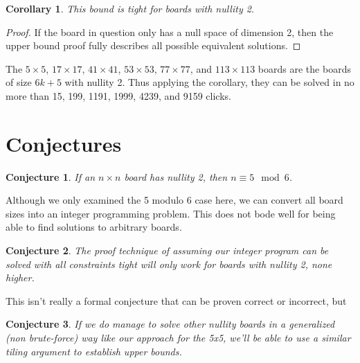 \documentclass{article}
\newtheorem{corollary}{Corollary}
\newtheorem{conjecture}{Conjecture}
\begin{document}
	\begin{corollary}
		This bound is tight for boards with nullity 2.
	\end{corollary}
	\begin{proof}
		If the board in question only has a null space of dimension 2, then the upper bound proof fully describes all possible equivalent solutions.
	\end{proof}

	The $5 \times 5$, $17 \times 17$, $41 \times 41$, $53 \times 53$, $77 \times 77$, and $113 \times 113$ boards are the boards of size $6k+5$ with nullity 2.
	Thus applying the corollary, they can be solved in no more than 15, 199, 1191, 1999, 4239, and 9159 clicks.
	
	\section{Conjectures}
	\begin{conjecture}
		If an $n \times n$ board has nullity 2, then $n \equiv 5 \mod 6$.
	\end{conjecture}

	Although we only examined the 5 modulo 6 case here, we can convert all board sizes into an integer programming problem.
	This does not bode well for being able to find solutions to arbitrary boards.
	\begin{conjecture}
		The proof technique of assuming our integer program can be solved with all constraints tight will only work for boards with nullity 2, none higher.
	\end{conjecture}

	This isn't really a formal conjecture that can be proven correct or incorrect, but
	\begin{conjecture}
		If we do manage to solve other nullity boards in a generalized (non brute-force) way like our approach for the 5x5, we'll be able to use a similar tiling argument to establish upper bounds.
	\end{conjecture}
\end{document}
